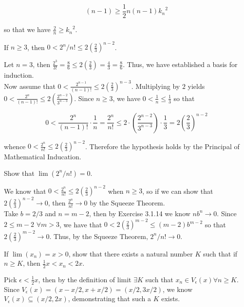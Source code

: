 \documentclass[paper=a4, fontsize=11pt]{scrartcl} %
\numberwithin{equation}{section} %
\numberwithin{figure}{section} %
\numberwithin{table}{section} %
\begin{document}
\begin{equation*}
(n - 1) \geq \frac{1}{2} n (n - 1) {k_n}^2
\end{equation*}

so that we have $\frac{2}{n} \geq {k_n}^2$.

 If $n \geq 3$, then $0 < 2^n/n! \leq 2(\frac{2}{3})^{n-2}$.

\pf Let $n = 3$, then $\frac{2^3}{3!} = \frac{8}{6} \leq 2(\frac{2}{3}) = \frac{4}{3} = \frac{8}{6}$. Thus, we have established a basis for induction.\\

Now assume that $0 < \frac{2^{n-1}}{(n-1)!} \leq 2\left(\frac{2}{3}\right)^{n-3}$. Multiplying by $2$ yields $ 0 < \frac{2^n}{(n-1)!} \leq 2\left(\frac{2^{n-2}}{3^{n-3}}\right)$. Since $n \geq 3$, we have $0 < \frac{1}{n} \leq \frac{1}{3}$ so that

\begin{equation*}
0 < \frac{2^n}{(n-1)!} \cdot \frac{1}{n} = \frac{2^n}{n!} \leq 2 \cdot \left(\frac{2^{n-2}}{3^{n-3}}\right) \cdot \frac{1}{3} = 2 \left( \frac{2}{3} \right)^{n-2} 
\end{equation*}

whence $0 < \frac{2^n}{n!} \leq 2\left(\frac{2}{3}\right)^{n-2}$. Therefore the hypothesis holds by the Principal of Mathematical Inducation. \done

 Show that $\lim(2^n/n!) = 0$.

\pf We know that $0 < \frac{2^n}{n!} \leq 2\left(\frac{2}{3}\right)^{n-2}$ when $n \geq 3$, so if we can show that $2\left(\frac{2}{3}\right)^{n-2} \rightarrow 0$, then $\frac{2^n}{n!} \rightarrow 0$ by the Squeeze Theorem.\\

Take $b = 2/3$ and $n = m - 2$, then by Exercise 3.1.14 we know $nb^n \rightarrow 0$. Since $2 \leq m - 2$ $\forall m > 3$, we have that $0 < 2(\frac{2}{3})^{m-2} \leq (m-2)b^{m-2}$ so that $2\left(\frac{2}{3}\right)^{m-2} \rightarrow 0$. Thus, by the Squeeze Theorem, $2^n / n! \rightarrow 0$. \done

 If $\lim(x_n) = x > 0$, show that there exists a natural number $K$ such that if $n \geq K$, then $\frac{1}{2}x < x_n < 2x$.

\pf Pick $\epsilon < \frac{1}{2} x$, then by the definition of limit $\exists K$ such that $x_n \in V_\epsilon(x) \forall n \geq K$. Since $V_\epsilon(x) = (x - x/2, x + x/2) = (x/2, 3x/2)$, we know $V_\epsilon(x) \subseteq (x/2, 2x)$, demonstrating that such a $K$ exists. \done
\end{document}
